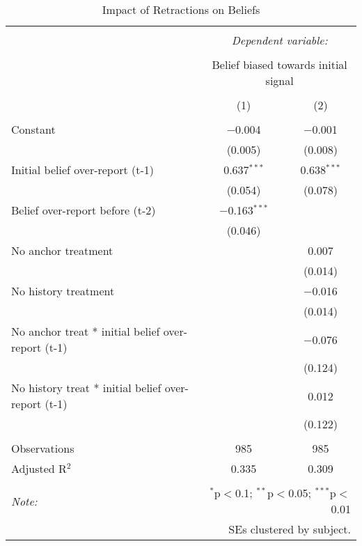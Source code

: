 
\begin{table}[!htbp] \centering 
  \caption{Impact of Retractions on Beliefs} 
  \label{tab:retractions_explanatory} 
\begin{tabular}{@{\extracolsep{5pt}}lcc} 
\\[-1.8ex]\hline 
\hline \\[-1.8ex] 
 & \multicolumn{2}{c}{\textit{Dependent variable:}} \\ 
\cline{2-3} 
\\[-1.8ex] & \multicolumn{2}{c}{Belief biased towards initial signal} \\ 
\\[-1.8ex] & (1) & (2)\\ 
\hline \\[-1.8ex] 
 Constant & $-$0.004 & $-$0.001 \\ 
  & (0.005) & (0.008) \\ 
  Initial belief over-report (t-1) & 0.637$^{***}$ & 0.638$^{***}$ \\ 
  & (0.054) & (0.078) \\ 
  Belief over-report before (t-2) & $-$0.163$^{***}$ &  \\ 
  & (0.046) &  \\ 
  No anchor treatment &  & 0.007 \\ 
  &  & (0.014) \\ 
  No history treatment &  & $-$0.016 \\ 
  &  & (0.014) \\ 
  No anchor treat * initial belief over-report (t-1) &  & $-$0.076 \\ 
  &  & (0.124) \\ 
  No history treat * initial belief over-report (t-1) &  & 0.012 \\ 
  &  & (0.122) \\ 
 \hline \\[-1.8ex] 
Observations & 985 & 985 \\ 
Adjusted R$^{2}$ & 0.335 & 0.309 \\ 
\hline 
\hline \\[-1.8ex] 
\textit{Note:}  & \multicolumn{2}{r}{$^{*}$p$<$0.1; $^{**}$p$<$0.05; $^{***}$p$<$0.01} \\ 
 & \multicolumn{2}{r}{SEs clustered by subject.} \\ 
\end{tabular} 
\end{table} 
